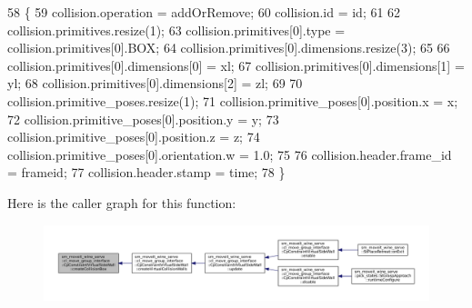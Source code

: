 \begin{DoxyCode}
58         \{
59             collision.operation = addOrRemove;
60             collision.id = id;
61 
62             collision.primitives.resize(1);
63             collision.primitives[0].type = collision.primitives[0].BOX;
64             collision.primitives[0].dimensions.resize(3);
65 
66             collision.primitives[0].dimensions[0] = xl;
67             collision.primitives[0].dimensions[1] = yl;
68             collision.primitives[0].dimensions[2] = zl;
69 
70             collision.primitive\_poses.resize(1);
71             collision.primitive\_poses[0].position.x = x;
72             collision.primitive\_poses[0].position.y = y;
73             collision.primitive\_poses[0].position.z = z;
74             collision.primitive\_poses[0].orientation.w = 1.0;
75 
76             collision.header.frame\_id = frameid;
77             collision.header.stamp = time;
78         \}
\end{DoxyCode}
Here is the caller graph for this function\+:
\nopagebreak
\begin{figure}[H]
\begin{center}
\leavevmode
\includegraphics[width=350pt]{classsm__moveit__wine__serve_1_1cl__move__group__interface_1_1CpConstraintVirtualSideWall_a52617a140c7a19b4f0a08804c3a8d3a6_icgraph}
\end{center}
\end{figure}
\mbox{\label{classsm__moveit__wine__serve_1_1cl__move__group__interface_1_1CpConstraintVirtualSideWall_a98576104cf4c349341031848477b2d5b}} 
